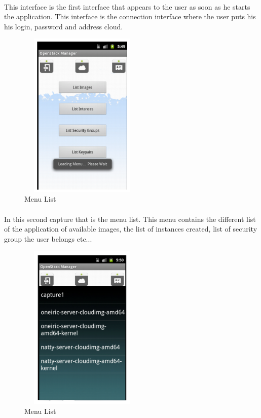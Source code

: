 \paragraph{}This interface is the first interface that appears to the user as soon as he starts the application. 
This interface is the connection interface where the user puts his his login, 
password and address cloud.

\begin{figure}[!h]
 \center
 \includegraphics[width=6cm, height=8cm]{./images/implementation/menu}
 \caption{Menu List}
\end{figure}
\paragraph{}
In this second capture that is the menu list. This menu contains the different list of the application of available images,  the list of instances created, 
list of security group the user belongs etc...


\begin{figure}[!h]
 \center
 \includegraphics[width=6cm, height=8cm]{./images/implementation/images}
 \caption{Menu List}
\end{figure}
